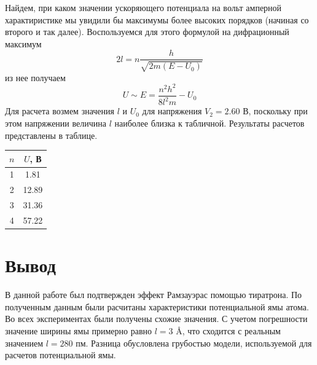 \documentclass[a4paper,12pt]{article} %
\begin{document}
    Найдем, при каком значении ускоряющего потенциала на вольт амперной характиристике мы увидили бы максимумы более высоких
    порядков (начиная со второго и так далее). Воспользуемся для этого формулой на дифрационный максимум
    \begin{equation}
        2 l = n \frac{h}{\sqrt{2m (E - U_0)}}
    \end{equation}
    из нее получаем
    \begin{equation}
        U \sim E = \frac{n^2 h^2}{8 l^2 m} - U_0
    \end{equation}
    Для расчета возмем значения $l$ и $U_0$ для напряжения $V_2 = 2.60$ В, поскольку при этом напряжении величина $l$ наиболее
    близка к табличной. Результаты расчетов представлены в таблице.
    \begin{table}[h]
      \centering
      \begin{tabular}{|c|c|}
      \hline
      $n$ & $U$, В     \\ \hline
      1   & 1.81       \\ \hline
      2   & 12.89      \\ \hline
      3   & 31.36      \\ \hline
      4   & 57.22      \\ \hline
      \end{tabular}
    \end{table}
  \section{Вывод}

    В данной работе был подтвержден эффект Рамзауэрас помощью тиратрона.
    По полученным данным были расчитаны характеристики потенциальной ямы атома. 
    Во всех экспериментах были получены схожие значения.
    С учетом погрешности значение ширины ямы примерно равно $l = 3$ \AA, что сходится с реальным значением $l = 280$ пм.
    Разница обусловлена грубостью модели, используемой для расчетов потенциальной ямы.
\end{document}
